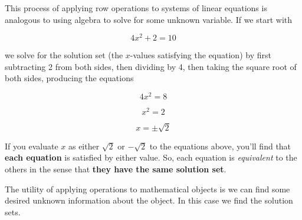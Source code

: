 \documentclass{ximera}
\begin{document}
\begin{exploration}
\begin{example}
        \begin{multipleChoice}
        \end{multipleChoice}
    
    \end{example}

    \begin{remark}
      This process of applying row operations to systems of linear equations is analogous to using algebra to solve for some unknown variable. If we start with 
      
      $$4x^2+2=10$$
      
      we solve for the solution set (the $x$-values satisfying the equation) by first subtracting 2 from both sides, then dividing by 4, then taking the square root of both sides, producing the equations
      
      $$4x^2=8$$
      
      $$x^2=2$$
      
      $$x=\pm\sqrt{2}$$
      
      If you evaluate $x$ as either $\sqrt{2}$ or $-\sqrt{2}$ to the equations above, you'll find that {\bf each equation} is satisfied by either value. So, each equation is \emph{equivalent} to the others in the sense that {\bf they have the same solution set}.
      
      The utility of applying operations to mathematical objects is we can find some desired unknown information about the object. In this case we find the solution sets.
      
      \end{remark}

  \end{exploration}
\end{document}
